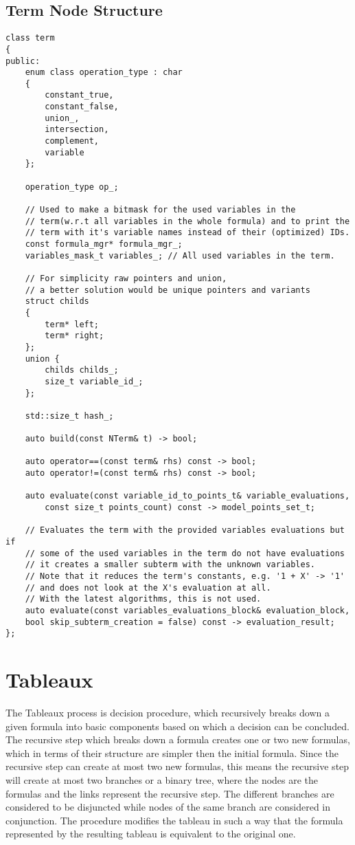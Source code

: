 \documentclass{article}
\begin{document}
		\subsection*{Term Node Structure}
		\begin{lstlisting}
class term
{
public:
    enum class operation_type : char
    {
        constant_true,
        constant_false,
        union_,
        intersection,
        complement,
        variable
    };

    operation_type op_;

    // Used to make a bitmask for the used variables in the 
    // term(w.r.t all variables in the whole formula) and to print the
    // term with it's variable names instead of their (optimized) IDs.
    const formula_mgr* formula_mgr_; 
    variables_mask_t variables_; // All used variables in the term.

    // For simplicity raw pointers and union, 
    // a better solution would be unique pointers and variants
    struct childs
    {
        term* left;
        term* right;
    };
    union {
        childs childs_;
        size_t variable_id_;
    };

    std::size_t hash_;

    auto build(const NTerm& t) -> bool;

    auto operator==(const term& rhs) const -> bool;
    auto operator!=(const term& rhs) const -> bool;

    auto evaluate(const variable_id_to_points_t& variable_evaluations, 
    	const size_t points_count) const -> model_points_set_t;

    // Evaluates the term with the provided variables evaluations but if
    // some of the used variables in the term do not have evaluations
    // it creates a smaller subterm with the unknown variables.
    // Note that it reduces the term's constants, e.g. '1 + X' -> '1'
    // and does not look at the X's evaluation at all.
    // With the latest algorithms, this is not used.
    auto evaluate(const variables_evaluations_block& evaluation_block, 
	bool skip_subterm_creation = false) const -> evaluation_result;
};
		\end{lstlisting}

	\section{Tableaux}
	The Tableaux process is decision procedure, which recursively breaks down a given formula into basic components 
	based on which a decision can be concluded. The recursive step which breaks down a formula creates one or two 
	new formulas, which in terms of their structure are simpler then the initial formula. Since the recursive step can create
	at most two new formulas, this means the recursive step will create at most two branches or a binary tree, where the nodes
	are the formulas and the links represent the recursive step. The different branches are considered to be disjuncted while
   	nodes of the same branch are considered in conjunction. The procedure modifies the tableau in such a way that the 
	formula represented by the resulting tableau is equivalent to the original one.
\end{document}
